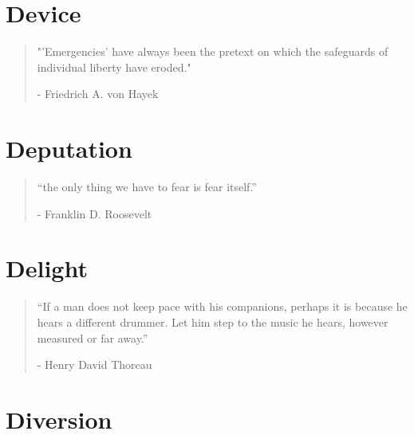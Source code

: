\chapter{Device} %

\vspace{-1.3cm}
\begin{localsize}{10}
	\begin{quote}
		"'Emergencies' have always been the pretext on which the safeguards of individual liberty have eroded."
		\begin{flushright}- Friedrich A. von Hayek\end{flushright}
	\end{quote} 
\end{localsize}
\vspace{1cm}


\chapter{Deputation} %

\vspace{-1.3cm}
\begin{localsize}{10}
	\begin{quote}
		“the only thing we have to fear is fear itself.”
		\begin{flushright}- Franklin D. Roosevelt \end{flushright}
	\end{quote} 
\end{localsize}
\vspace{1cm}

\chapter{Delight} %

\vspace{-1.3cm}
\begin{localsize}{10}
	\begin{quote}
		“If a man does not keep pace with his companions, perhaps it is because he hears a different drummer. Let him step to the music he hears, however measured or far away.”
		\begin{flushright}- Henry David Thoreau \end{flushright}
	\end{quote} 
\end{localsize}
\vspace{1cm}

\chapter{Diversion} %

